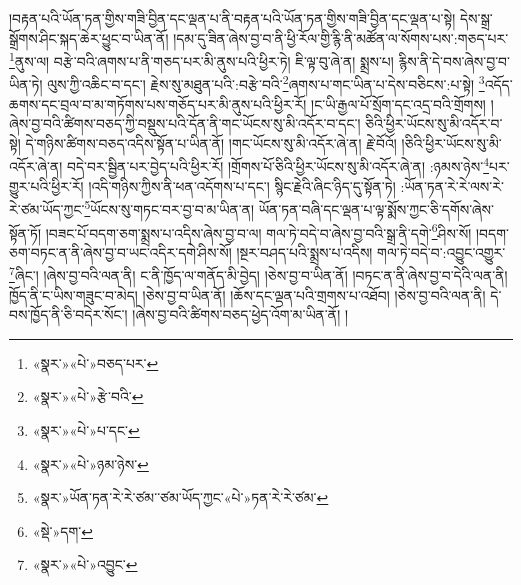 །བརྟན་པའི་ཡོན་ཏན་གྱིས་གཟི་བྱིན་དང་ལྡན་པ་ནི་བརྟན་པའི་ཡོན་ཏན་གྱིས་གཟི་བྱིན་དང་ལྡན་པ་སྟེ། དེས་སྒྲ་སྒྲོགས་ཤིང་སྐད་ཆེར་ཕྱུང་བ་ཡིན་ནོ། །དམ་དུ་ཟིན་ཞེས་བྱ་བ་ནི་ཕྱི་རོལ་གྱི་རྙི་ནི་མཚོན་ལ་སོགས་པས་:གཅད་པར་\footnote{«སྣར་»«པེ་»བཅད་པར་}ནུས་ལ། བརྩེ་བའི་ཞགས་པ་ནི་གཅད་པར་མི་ནུས་པའི་ཕྱིར་ཏེ། ཇི་ལྟ་བུ་ཞེ་ན། སྨྲས་པ། རྙིས་ནི་དེ་བས་ཞེས་བྱ་བ་ཡིན་ཏེ། ལུས་ཀྱི་འཆིང་བ་དང་། རྗེས་སུ་མཐུན་པའི་:བརྩེ་བའི་\footnote{«སྣར་»«པེ་»རྩེ་བའི་}ཞགས་པ་གང་ཡིན་པ་དེས་བཅིངས་:པ་སྟེ། \footnote{«སྣར་»«པེ་»པ་དང་}འདོད་ཆགས་དང་བྲལ་བ་མ་གཏོགས་པས་གཅོད་པར་མི་ནུས་པའི་ཕྱིར་རོ། །ང་ཡི་རྒྱལ་པོ་སྲོག་དང་འདྲ་བའི་གྲོགས། །ཞེས་བྱ་བའི་ཚིགས་བཅད་ཀྱི་བསྡུས་པའི་དོན་ནི་གང་ཡོངས་སུ་མི་འདོར་བ་དང་། ཅིའི་ཕྱིར་ཡོངས་སུ་མི་འདོར་བ་སྟེ། དེ་གཉིས་ཚིགས་བཅད་འདིས་སྟོན་པ་ཡིན་ནོ། །གང་ཡོངས་སུ་མི་འདོར་ཞེ་ན། རྗེ་བོའོ། །ཅིའི་ཕྱིར་ཡོངས་སུ་མི་འདོར་ཞེ་ན། བདེ་བར་སྦྱིན་པར་བྱེད་པའི་ཕྱིར་རོ། །གྲོགས་པོ་ཅིའི་ཕྱིར་ཡོངས་སུ་མི་འདོར་ཞེ་ན། :ཉམས་ཉེས་\footnote{«སྣར་»«པེ་»ཉམ་ཉེས་}པར་གྱུར་པའི་ཕྱིར་རོ། །འདི་གཉིས་ཀྱིས་ནི་ཕན་འདོགས་པ་དང་། སྙིང་རྗེའི་ཞིང་ཉིད་དུ་སྟོན་ཏེ། :ཡོན་ཏན་རེ་རེ་ལས་རེ་རེ་ཙམ་ཡོད་ཀྱང་\footnote{«སྣར་»ཡོན་ཏན་རེ་རེ་ཙམ་་ཙམ་ཡོད་ཀྱང་«པེ་»ཏན་རེ་རེ་ཙམ་}ཡོངས་སུ་གཏང་བར་བྱ་བ་མ་ཡིན་ན། ཡོན་ཏན་བཞི་དང་ལྡན་པ་ལྟ་སྨོས་ཀྱང་ཅི་དགོས་ཞེས་སྟོན་ཏོ། །བཟང་པོ་བདག་ཅག་སྨྲས་པ་འདིས་ཞེས་བྱ་བ་ལ། གལ་ཏེ་བདེ་བ་ཞེས་བྱ་བའི་སྒྲ་ནི་དགེ་\footnote{«སྡེ་»དག་}ཤིས་སོ། །བདག་ཅག་བཏང་ན་ནི་ཞེས་བྱ་བ་ཡང་འདིར་དགེ་ཤིས་སོ། །སྔར་བཤད་པའི་སྨྲས་པ་འདིས། གལ་ཏེ་བདེ་བ་:འབྱུང་འགྱུར་\footnote{«སྣར་»«པེ་»འབྱུང་}ཞིང་། །ཞེས་བྱ་བའི་ལན་ནི། ང་ནི་ཁྱོད་ལ་གནོད་མི་བྱེད། །ཅེས་བྱ་བ་ཡིན་ནོ། །བཏང་ན་ནི་ཞེས་བྱ་བ་དེའི་ལན་ནི། ཁྱོད་ནི་ང་ཡིས་གཟུང་བ་མེད། །ཅེས་བྱ་བ་ཡིན་ནོ། །ཆོས་དང་ལྡན་པའི་གྲགས་པ་འཐོབ། །ཅེས་བྱ་བའི་ལན་ནི། དེ་བས་ཁྱོད་ནི་ཅི་བདེར་སོང་། །ཞེས་བྱ་བའི་ཚིགས་བཅད་ཕྱེད་འོག་མ་ཡིན་ནོ། །

